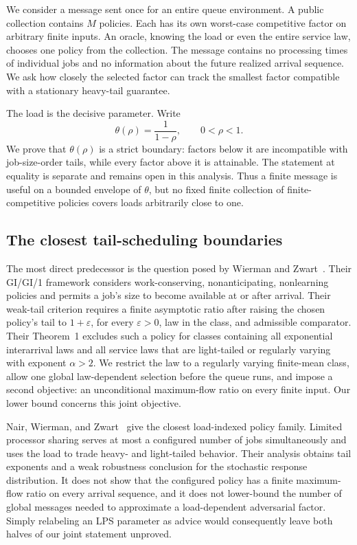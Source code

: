 We consider a message sent once for an entire queue environment. A public collection contains $M$ policies. Each has its own worst-case competitive factor on arbitrary finite inputs. An oracle, knowing the load or even the entire service law, chooses one policy from the collection. The message contains no processing times of individual jobs and no information about the future realized arrival sequence. We ask how closely the selected factor can track the smallest factor compatible with a stationary heavy-tail guarantee.

The load is the decisive parameter. Write
\begin{equation}\label{eq:theta-intro}
 \theta(\rho)=\frac{1}{1-\rho},\qquad 0<\rho<1.
\end{equation}
We prove that $\theta(\rho)$ is a strict boundary: factors below it are incompatible with job-size-order tails, while every factor above it is attainable. The statement at equality is separate and remains open in this analysis. Thus a finite message is useful on a bounded envelope of $\theta$, but no fixed finite collection of finite-competitive policies covers loads arbitrarily close to one.

\subsection{The closest tail-scheduling boundaries}
The most direct predecessor is the question posed by Wierman and Zwart~\cite{wierman2012}. Their GI/GI/1 framework considers work-conserving, nonanticipating, nonlearning policies and permits a job's size to become available at or after arrival. Their weak-tail criterion requires a finite asymptotic ratio after raising the chosen policy's tail to $1+\varepsilon$, for every $\varepsilon>0$, law in the class, and admissible comparator. Their Theorem~1 excludes such a policy for classes containing all exponential interarrival laws and all service laws that are light-tailed or regularly varying with exponent $\alpha>2$. We restrict the law to a regularly varying finite-mean class, allow one global law-dependent selection before the queue runs, and impose a second objective: an unconditional maximum-flow ratio on every finite input. Our lower bound concerns this joint objective.

Nair, Wierman, and Zwart~\cite{nair2010} give the closest load-indexed policy family. Limited processor sharing serves at most a configured number of jobs simultaneously and uses the load to trade heavy- and light-tailed behavior. Their analysis obtains tail exponents and a weak robustness conclusion for the stochastic response distribution. It does not show that the configured policy has a finite maximum-flow ratio on every arrival sequence, and it does not lower-bound the number of global messages needed to approximate a load-dependent adversarial factor. Simply relabeling an LPS parameter as advice would consequently leave both halves of our joint statement unproved.

